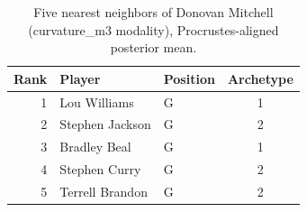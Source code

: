 \begin{table}[htbp]
  \centering\small
  \begin{tabular}{rllc}
    \toprule
    Rank & Player & Position & Archetype \\
    \midrule
    1 & Lou Williams & G & 1 \\
    2 & Stephen Jackson & G & 2 \\
    3 & Bradley Beal & G & 1 \\
    4 & Stephen Curry & G & 2 \\
    5 & Terrell Brandon & G & 2 \\
    \bottomrule
  \end{tabular}
  \caption{Five nearest neighbors of Donovan Mitchell (curvature_m3 modality), Procrustes-aligned posterior mean.}
  \label{tab:Donovan_Mitchell_neighbors_curvature_m3}
\end{table}

